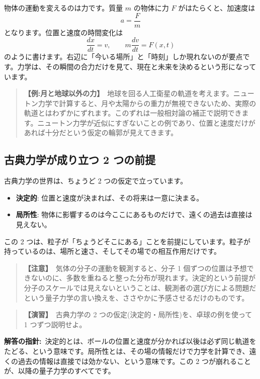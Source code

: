 \documentclass{article}
\begin{document}
物体の運動を変えるのは力です。質量 \(m\) の物体に力 \(F\) がはたらくと、加速度は
\[ a = \frac{F}{m} \]
となります。位置と速度の時間変化は
\[ \frac{dx}{dt} = v, \qquad m \frac{dv}{dt} = F(x, t) \]
のように書けます。右辺に「今いる場所」と「時刻」しか現れないのが要点です。力学は、その瞬間の合力だけを見て、現在と未来を決めるという形になっています。

\begin{quote}
\textbf{【例:月と地球以外の力】}\ 地球を回る人工衛星の軌道を考えます。ニュートン力学で計算すると、月や太陽からの重力が無視できないため、実際の軌道とはわずかにずれます。このずれは一般相対論の補正で説明できます。ニュートン力学が近似にすぎないことの例であり、位置と速度だけがあれば十分だという仮定の輪郭が見えてきます。
\end{quote}

\subsection{古典力学が成り立つ 2 つの前提}

古典力学の世界は、ちょうど 2 つの仮定で立っています。
\begin{itemize}
\item \textbf{決定的}: 位置と速度が決まれば、その将来は一意に決まる。
\item \textbf{局所性}: 物体に影響するのは今ここにあるものだけで、遠くの過去は直接は見えない。
\end{itemize}

この 2 つは、粒子が「ちょうどそこにある」ことを前提にしています。粒子が持っているのは、場所と速さ、そしてその場での相互作用だけです。

\begin{quote}
\textbf{【注意】}\ 気体の分子の運動を観測すると、分子 1 個ずつの位置は予想できないのに、多数を重ねると整った分布が現れます。決定的という前提が分子のスケールでは見えないということは、観測者の選び方による問題だという量子力学の言い換えを、ささやかに予感させるだけのものです。
\end{quote}

\begin{quote}
\textbf{【演習】}\ 古典力学の 2 つの仮定(決定的・局所性)を、卓球の例を使って 1 つずつ説明せよ。
\end{quote}

\textbf{解答の指針:}\ 決定的とは、ボールの位置と速度が分かれば以後は必ず同じ軌道をたどる、という意味です。局所性とは、その場の情報だけで力学を計算でき、遠くの過去の情報は直接では効かない、という意味です。この 2 つが崩れることが、以降の量子力学のすべてです。
\end{document}
